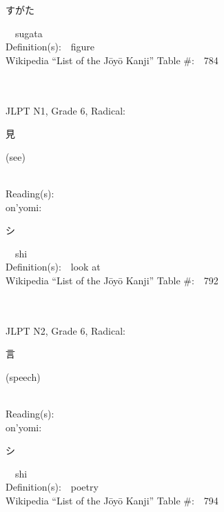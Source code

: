 \begin{multicols}{2}
{\hspace*{2em}}{\begin{CJK}{UTF8}{min} すがた \end{CJK}}\ \ sugata\ \ \\
Definition(s):\ \ figure \\
Wikipedia ``List of the J\=oy\=o Kanji'' Table \#:\ \ 784 \\
\ \ \\
{\fontsize{34pt}{40pt}  }\ \ \\  %
{JLPT N1, Grade 6, Radical:\ \ {\begin{CJK}{UTF8}{min} 見 \end{CJK}} (see) } \\
Reading(s):\ \ \\
{\hspace*{1em}}on'yomi:\ \ \\
{\hspace*{2em}}{\begin{CJK}{UTF8}{min} シ \end{CJK}}\ \ shi\ \ \\
Definition(s):\ \ look at \\
Wikipedia ``List of the J\=oy\=o Kanji'' Table \#:\ \ 792 \\
\ \ \\
{\fontsize{34pt}{40pt}  }\ \ \\  %
{JLPT N2, Grade 6, Radical:\ \ {\begin{CJK}{UTF8}{min} 言 \end{CJK}} (speech) } \\
Reading(s):\ \ \\
{\hspace*{1em}}on'yomi:\ \ \\
{\hspace*{2em}}{\begin{CJK}{UTF8}{min} シ \end{CJK}}\ \ shi\ \ \\
Definition(s):\ \ poetry \\
Wikipedia ``List of the J\=oy\=o Kanji'' Table \#:\ \ 794 \\
\ \ \\

\end{multicols}
